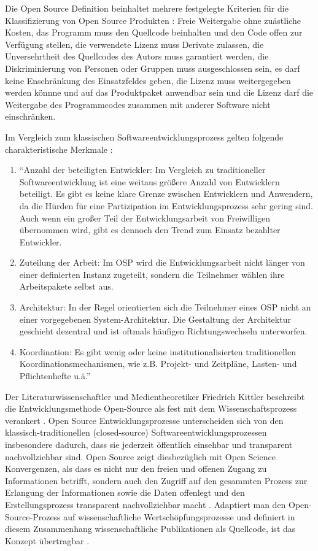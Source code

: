 Die Open Source Definition beinhaltet mehrere festgelegte Kriterien für die Klassifizierung von Open Source Produkten \cite{suchen}: Freie Weitergabe ohne zuästliche Kosten, das Programm muss den Quellcode beinhalten und den Code offen zur Verfügung stellen, die verwendete Lizenz muss Derivate zulassen, die Unversehrtheit des Quellcodes des Autors muss garantiert werden, die Diskriminierung von Personen oder Gruppen muss ausgeschlossen sein, es darf keine Enschränkung des Einsatzfeldes geben, die Lizenz muss weitergegeben werden könnne und auf das Produktpaket anwendbar sein und die Lizenz darf die Weitergabe des Programmcodes zusammen mit anderer Software nicht einschränken.

Im Vergleich zum klassischen Softwareentwicklungsprozess gelten folgende charakteristische Merkmale \cite{suchen}:
\begin{enumerate}
\item “Anzahl der beteiligten Entwickler: Im Vergleich zu traditioneller Softwareentwicklung ist eine weitaus größere Anzahl von Entwicklern beteiligt. Es gibt es keine klare Grenze zwischen Entwicklern und Anwendern, da die Hürden für eine Partizipation im Entwicklungsprozess sehr gering sind. Auch wenn ein großer Teil der Entwicklungsarbeit von Freiwilligen übernommen wird, gibt es dennoch den Trend zum Einsatz bezahlter Entwickler.
\item Zuteilung der Arbeit: Im OSP wird die Entwicklungsarbeit nicht länger von einer definierten Instanz zugeteilt, sondern die Teilnehmer wählen ihre Arbeitspakete selbst aus.
\item Architektur: In der Regel orientierten sich die Teilnehmer eines OSP nicht an einer vorgegebenen System-Architektur. Die Gestaltung der Architektur geschieht dezentral und ist oftmals häufigen Richtungswechseln unterworfen.
\item Koordination: Es gibt wenig oder keine institutionalisierten traditionellen Koordinationsmechanismen, wie z.B. Projekt- und Zeitpläne, Lasten- und Pflichtenhefte u.ä.” \cite{suchen}
\end{enumerate}

Der Literaturwissenschaftler und Medientheoretiker Friedrich Kittler beschreibt die Entwicklungsmethode Open-Source als fest mit dem Wissenschaftsprozess verankert \cite{suchen}. Open Source Entwicklungsprozesse unterscheiden sich von den klassisch-traditionellen (closed-source) Softwareentwicklungsprozessen insbesondere dadurch, dass sie jederzeit öffentlich einsehbar und transparent nachvollziehbar sind. Open Source zeigt diesbezüglich mit Open Science Konvergenzen, als dass es nicht nur den freien und offenen Zugang zu Informationen betrifft, sondern auch den Zugriff auf den gesammten Prozess zur Erlangung der Informationen sowie die Daten offenlegt und den Erstellungsprozess transparent nachvollziehbar macht \cite{kelty_2004}. Adaptiert man den Open-Source-Prozess auf wissenschaftliche Wertschöpfungsprozesse und definiert in diesem Zusammenhang wissenschaftliche Publikationen als Quellcode, ist das Konzept übertragbar \cite{Singh_2008} \cite{Bradley_2008} \cite{Bradley_2007}.

